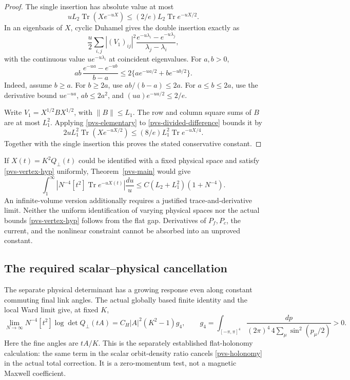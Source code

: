 \begin{proof}
The single insertion has absolute value at most
\[
 uL_2\operatorname{Tr}(Xe^{-uX})
 \le(2/e)L_2\operatorname{Tr}e^{-uX/2}.
\]
In an eigenbasis of \(X\), cyclic Duhamel gives the double
insertion exactly as
\begin{equation}
 \frac u2\sum_{i,j}|(V_1)_{ij}|^2
       \frac{e^{-u\lambda_i}-e^{-u\lambda_j}}
                         {\lambda_j-\lambda_i},
 \label{pvs-divided-difference}
\end{equation}
with the continuous value \(ue^{-u\lambda_i}\) at coincident
eigenvalues.
For \(a,b>0\),
\begin{equation}
 ab\,\frac{e^{-ua}-e^{-ub}}{b-a}
 \le2\{ae^{-ua/2}+be^{-ub/2}\}.
 \label{pvs-elementary}
\end{equation}
Indeed, assume \(b\ge a\).
For \(b\ge2a\), use \(ab/(b-a)\le2a\).
For \(a\le b\le2a\), use the derivative bound
\(ue^{-ua}\), \(ab\le2a^2\), and
\((ua)e^{-ua/2}\le2/e\).

Write \(V_1=X^{1/2}BX^{1/2}\), with \(\|B\|\le L_1\).
The row and column square sums of \(B\) are at most \(L_1^2\).
Applying \eqref{pvs-elementary} to
\eqref{pvs-divided-difference} bounds it by
\[
 2uL_1^2\operatorname{Tr}(Xe^{-uX/2})
 \le(8/e)L_1^2\operatorname{Tr}e^{-uX/4}.
\]
Together with the single insertion this proves the stated
conservative constant.
\end{proof}

If \(X(t)=K^2Q_\perp(t)\) could be identified with a fixed
physical space and satisfy \eqref{pvs-vertex-hyp} uniformly,
Theorem~\ref{pvs-main} would give
\begin{equation}
 \int_1^\infty
 \left|N^{-4}[t^2]\operatorname{Tr}e^{-uX(t)}\right|
 \frac{du}{u}
 \le C(L_2+L_1^2)(1+N^{-4}).
 \label{pvs-conditional-tail}
\end{equation}
An infinite-volume version additionally requires a justified
trace-and-derivative limit.
Neither the uniform identification of varying physical spaces
nor the actual bounds \eqref{pvs-vertex-hyp} follows from the
flat gap.
Derivatives of \(P_f,P_c\), the current, and the nonlinear
constraint cannot be absorbed into an unproved constant.

\subsection{The required scalar--physical cancellation}
\label{pvs-scope-section}

The separate physical determinant has a growing response even
along constant commuting final link angles.
The actual globally based finite identity and the local Ward
limit give, at fixed \(K\),
\begin{equation}
 \lim_{N\to\infty}N^{-4}[t^2]\log\det Q_\perp(tA)
   =C_H|A|^2(K^2-1)g_4,\qquad
 g_4=\int_{[-\pi,\pi]^4}
       \frac{dp}{(2\pi)^4\,4\sum_\mu\sin^2(p_\mu/2)}>0 .
 \label{pvs-holonomy}
\end{equation}
Here the fine angles are \(tA/K\).
This is the separately established flat-holonomy calculation:
the same term in the scalar orbit-density ratio cancels
\eqref{pvs-holonomy} in the actual total correction.
It is a zero-momentum test, not a magnetic Maxwell coefficient.

